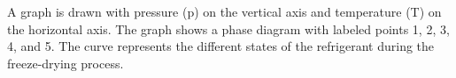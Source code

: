 A graph is drawn with pressure (p) on the vertical axis and temperature (T) on the horizontal axis. The graph shows a phase diagram with labeled points 1, 2, 3, 4, and 5. The curve represents the different states of the refrigerant during the freeze-drying process.